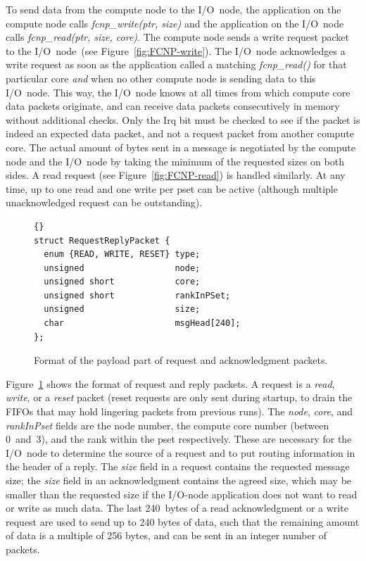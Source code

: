 \documentclass[journal]{IEEEtran}
\begin{document}
To send data from the compute node to the I/O~node, the application on the
compute node calls \emph{fcnp\_write(ptr, size)\/} and the application on the
I/O~node calls \emph{fcnp\_read(ptr, size, core)}.
The compute node sends a write request packet to the I/O~node~(see
Figure~\ref{fig:FCNP-write}).
The I/O~node acknowledges a write request as soon as the application called a
matching \emph{fcnp\_read()} for that particular core \emph{and\/} when no
other compute node is sending data to this I/O~node.
This way, the I/O~node knows at all times from which compute core data packets
originate, and can receive data packets consecutively in memory without
additional checks.
Only the Irq bit must be checked to see if the packet is indeed an expected
data packet, and not a request packet from another compute core.
The actual amount of bytes sent in a message is negotiated by the compute node
and the I/O~node by taking the minimum of the requested sizes on both sides.
A read request (see Figure~\ref{fig:FCNP-read}) is handled similarly.
At any time, up to one read and one write per pset can be active (although
multiple unacknowledged request can be outstanding).

\begin{figure}[h]
\begin{lstlisting}{}
struct RequestReplyPacket {
  enum {READ, WRITE, RESET} type;
  unsigned                  node;
  unsigned short            core;
  unsigned short            rankInPSet;
  unsigned                  size;
  char                      msgHead[240];
};
\end{lstlisting}
\caption{Format of the payload part of request and acknowledgment packets.}
\label{fig:control-packet-format}
\end{figure}


Figure~\ref{fig:control-packet-format} shows the format of request and reply
packets.
A request is a \emph{read}, \emph{write}, or a \emph{reset\/} packet
(reset requests are only sent during startup, to drain the FIFOs that may hold
lingering packets from previous runs).
The \emph{node}, \emph{core}, and \emph{rankInPset} fields are the node number,
the compute core number (between 0~and~3), and the rank within the pset
respectively.
These are necessary for the I/O~node to determine the source of a request
and to put routing information in the header of a reply.
The \emph{size} field in a request contains the requested message size;
the \emph{size} field in an acknowledgment contains the agreed size, which
may be smaller than the requested size if the I/O-node application does not
want to read or write as much data.
The last 240~bytes of a read acknowledgment or a write request are used to
send up to 240 bytes of data, such that the remaining amount of data is a
multiple of 256 bytes, and can be sent in an integer number of packets.
\end{document}
